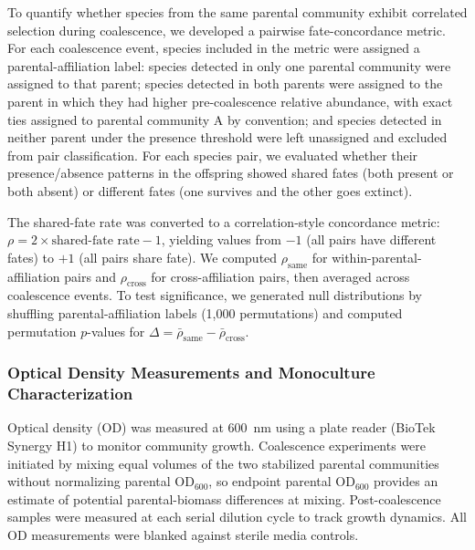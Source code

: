 To quantify whether species from the same parental community exhibit correlated selection during coalescence, we developed a pairwise fate-concordance metric. For each coalescence event, species included in the metric were assigned a parental-affiliation label: species detected in only one parental community were assigned to that parent; species detected in both parents were assigned to the parent in which they had higher pre-coalescence relative abundance, with exact ties assigned to parental community A by convention; and species detected in neither parent under the presence threshold were left unassigned and excluded from pair classification. For each species pair, we evaluated whether their presence/absence patterns in the offspring showed shared fates (both present or both absent) or different fates (one survives and the other goes extinct).

The shared-fate rate was converted to a correlation-style concordance metric: $\rho = 2 \times \text{shared-fate rate} - 1$, yielding values from $-1$ (all pairs have different fates) to $+1$ (all pairs share fate). We computed $\rho_{\text{same}}$ for within-parental-affiliation pairs and $\rho_{\text{cross}}$ for cross-affiliation pairs, then averaged across coalescence events. To test significance, we generated null distributions by shuffling parental-affiliation labels (1,000 permutations) and computed permutation $p$-values for $\Delta = \bar{\rho}_{\text{same}} - \bar{\rho}_{\text{cross}}$. 


\subsubsection*{Optical Density Measurements and Monoculture Characterization}
\label{sec:suppl:od}

Optical density (OD) was measured at 600~nm using a plate reader (BioTek Synergy H1) to monitor community growth. Coalescence experiments were initiated by mixing equal volumes of the two stabilized parental communities without normalizing parental OD$_{600}$, so endpoint parental OD$_{600}$ provides an estimate of potential parental-biomass differences at mixing. Post-coalescence samples were measured at each serial dilution cycle to track growth dynamics. All OD measurements were blanked against sterile media controls.

